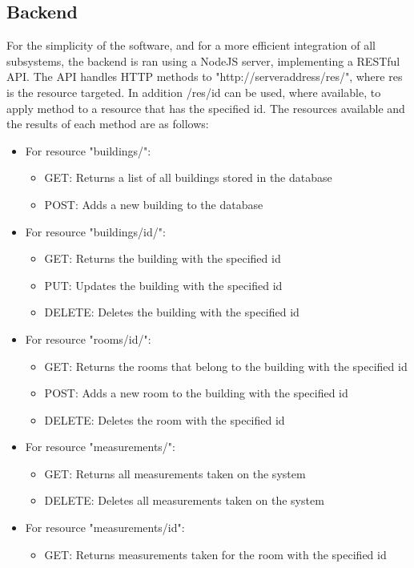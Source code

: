 \subsection{Backend}
For the simplicity of the software, and for a more efficient integration of all subsystems, the backend is ran using a NodeJS server, implementing a RESTful API.
The API handles HTTP methods to "http://serveraddress/res/", where res is the resource targeted. In addition /res/id can be used, where available, to apply method to a resource that has the specified id.
The resources available and the results of each method are as follows:
\begin{itemize}
\item For resource "buildings/":
	\begin{itemize}
	\item GET: Returns a list of all buildings stored in the database
	\item POST: Adds a new building to the database
	\end{itemize}
\item For resource "buildings/id/":
	\begin{itemize}
	\item GET: Returns the building with the specified id
	\item PUT: Updates the building with the specified id
	\item DELETE: Deletes the building with the specified id
	\end{itemize}
\item For resource "rooms/id/":
	\begin{itemize}
	\item GET: Returns the rooms that belong to the building with the specified id
	\item POST: Adds a new room to the building with the specified id
	\item DELETE: Deletes the room with the specified id
	\end{itemize}
\item For resource "measurements/":
	\begin{itemize}
	\item GET: Returns all measurements taken on the system
	\item DELETE: Deletes all measurements taken on the system
	\end{itemize}
\item For resource "measurements/id":
	\begin{itemize}
	\item GET: Returns measurements taken for the room with the specified id

\end{itemize}
\end{itemize}
